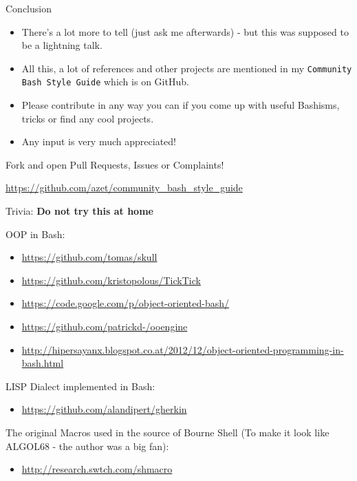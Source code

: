 \begin{frame}{Conclusion}

\begin{itemize}
\itemsep1pt\parskip0pt
\item
  There's a lot more to tell (just ask me afterwards) - but this was
  supposed to be a lightning talk.
\item
  All this, a lot of references and other projects are mentioned in my
  \texttt{Community Bash Style Guide} which is on GitHub.
\item
  Please contribute in any way you can if you come up with useful
  Bashisms, tricks or find any cool projects.
\item
  Any input is very much appreciated!
\end{itemize}

\begin{block}{Fork and open Pull Requests, Issues or Complaints!}

\url{https://github.com/azet/community_bash_style_guide}

\end{block}

\end{frame}

\begin{frame}{Trivia: \textbf{Do not try this at home}}

\vfill
OOP in Bash:

\begin{itemize}
\itemsep1pt\parskip0pt
\item
  \url{https://github.com/tomas/skull}
\item
  \url{https://github.com/kristopolous/TickTick}
\item
  \url{https://code.google.com/p/object-oriented-bash/}
\item
  \url{https://github.com/patrickd-/ooengine}
\item
  \url{http://hipersayanx.blogspot.co.at/2012/12/object-oriented-programming-in-bash.html}
\end{itemize}

\vfill
LISP Dialect implemented in Bash:

\begin{itemize}
\itemsep1pt\parskip0pt
\item
  \url{https://github.com/alandipert/gherkin}
\end{itemize}

\vfill

The original Macros used in the source of Bourne Shell (To make it look
like ALGOL68 - the author was a big fan):

\begin{itemize}
\itemsep1pt\parskip0pt
\item
  \url{http://research.swtch.com/shmacro}
\end{itemize}

\end{frame}
